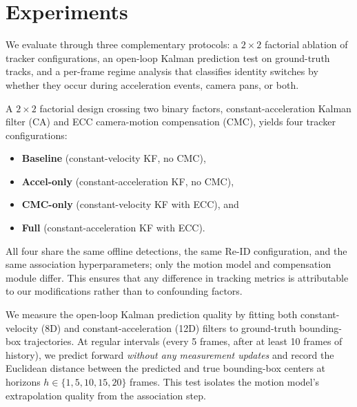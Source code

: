 %
%

\section{Experiments}
\label{sec:experiments}

We evaluate through three complementary protocols: a $2 \times 2$ factorial
ablation of tracker configurations, an open-loop Kalman prediction test on
ground-truth tracks, and a per-frame regime analysis that classifies
identity switches by whether they occur during acceleration events, camera
pans, or both.

A $2 \times 2$ factorial design crossing two binary factors, constant-acceleration
Kalman filter (CA) and ECC camera-motion compensation (CMC), yields four
tracker configurations:

\begin{itemize}
    \item \textbf{Baseline} (constant-velocity KF, no CMC),
    \item \textbf{Accel-only} (constant-acceleration KF, no CMC),
    \item \textbf{CMC-only} (constant-velocity KF with ECC), and
    \item \textbf{Full} (constant-acceleration KF with ECC).
\end{itemize}
All four share the same offline detections, the same Re-ID
configuration, and the same association hyperparameters; only the motion
model and compensation module differ. This ensures that any difference in
tracking metrics is attributable to our modifications rather than to
confounding factors.

We measure the open-loop Kalman prediction quality by fitting both
constant-velocity (8D) and constant-acceleration (12D) filters to
ground-truth bounding-box trajectories. At regular intervals (every 5
frames, after at least 10 frames of history), we predict forward
\emph{without any measurement updates} and record the Euclidean distance
between the predicted and true bounding-box centers at horizons
$h \in \{1, 5, 10, 15, 20\}$ frames. This test isolates the motion model's
extrapolation quality from the association step.

